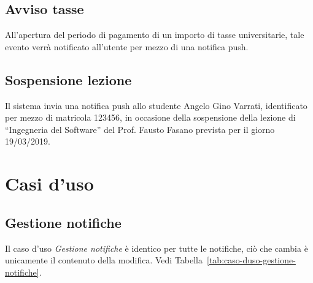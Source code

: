 \subsection{Avviso tasse}

All’apertura del periodo di pagamento di un importo di tasse universitarie, tale evento verrà notificato all’utente per mezzo di una notifica push.

\subsection{Sospensione lezione}

Il sistema invia una notifica push allo studente Angelo Gino Varrati, identificato per mezzo di matricola 123456, in occasione della sospensione della lezione di “Ingegneria del Software” del Prof. Fausto Fasano prevista per il giorno 19/03/2019.

\section{Casi d'uso}

\subsection{Gestione notifiche}

Il caso d'uso \emph{Gestione notifiche} è identico per tutte le notifiche, ciò che cambia è unicamente il contenuto della modifica. Vedi Tabella~\vref{tab:caso-duso-gestione-notifiche}.

